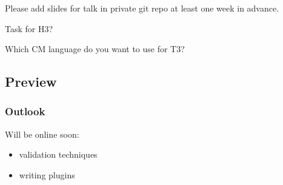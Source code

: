 \begin{assignment}
	Please add slides for talk in private git repo at least one week in advance.
\end{assignment}

\begin{assignment}
	Task for H3?
\end{assignment}

\begin{assignment}
	Which CM language do you want to use for T3?
\end{assignment}

\subsection{Preview}

\begin{frame}
	\frametitle{Outlook}

	Will be online soon:
	\begin{itemize}[<+-| alert@+>]
	\item validation techniques
	\item writing plugins
	\end{itemize}
\end{frame}



\appendix

\begin{frame}[allowframebreaks]
	
	
\end{frame}




